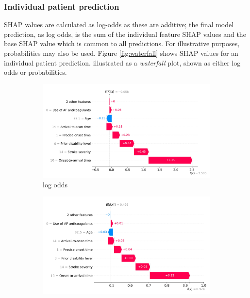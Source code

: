 \subsubsection{Individual patient prediction}

SHAP values are calculated as log-odds as these are additive; the final model prediction, as log odds, is the sum of the individual feature SHAP values and the base SHAP value which is common to all predictions. For illustrative purposes, probabilities may also be used. Figure \ref{fig:waterfall} shows SHAP values for an individual patient prediction. illustrated as a \textit{waterfall} plot, shown as either log odds or probabilities.


\begin{figure}
    \centering
    \begin{subfigure}[b]{0.48\textwidth}
        \centering
        \includegraphics[width=\textwidth]{images/p2_waterfall_odds.jpg}
        \caption{log odds}
        \label{fig:waterfall_subfig1}
    \end{subfigure}
    \hfill
    \begin{subfigure}[b]{0.48\textwidth}
        \centering
        \includegraphics[width=\textwidth]{images/p2_waterfall_probs.jpg}

\end{subfigure}
\end{figure}
